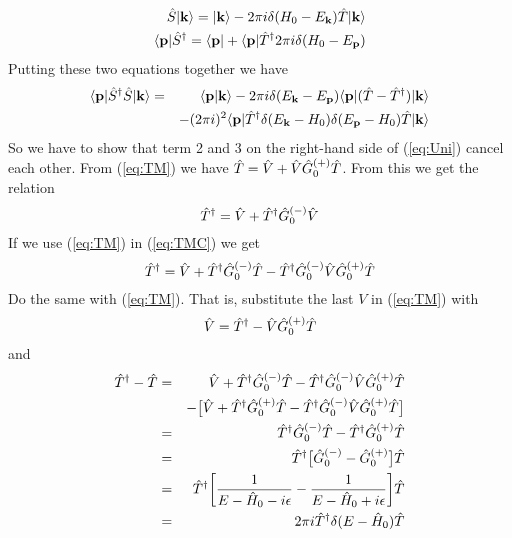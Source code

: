 \begin{eqnarray}
\hat{S}|{\bf k}\rangle=|{\bf k}\rangle-2\pi i \delta (H_0-E_{\bf k}){\hat{T}}|{\bf k}\rangle\\
\langle{\bf p}|\hat{S}^{\dagger}=\langle{\bf p}|
+\langle{\bf p}|{\hat{T}}^{\dagger}  2\pi i \delta (H_0-E_{\bf p}) 
\end{eqnarray}
%                                                 
Putting these two equations together we have
%                                                 
\begin{eqnarray}\label{eq:Uni} 
\braketm{{\bf p}}{\op{S}^{\dagger}\op{S}}{{\bf k}} &=&
\braket{{\bf p}}{{\bf k}}-2\pi i \delta (E_{\bf k}-E_{\bf p})\braketm{{\bf p}}
{(\op{T}-\op{T}^{\dagger})}{{\bf k}}\nonumber\\
& &
-(2\pi i)^2 
\braketm{{\bf p}}{\op{T}^{\dagger}\delta (E_{\bf k}-H_0 ) \delta (E_{\bf p}-H_0 )
\op{T}}{{\bf k}}
\end{eqnarray}
%                                                 
So we have to show that term 2 and 3 on the right-hand side of (\ref{eq:Uni}) cancel 
each other. From (\ref{eq:TM}) we have $\hat{T}=\hat{V}+\hat{V}\hat{G}^{(+)}_0\hat{T}$. 
From this we get the relation
%                                                 
\begin{equation}\label{eq:TMC} 
\op{T}^{\dagger}=\op{V}+\op{T}^{\dagger}\op{G}^{(-)}_0\op{V}
\end{equation}
%                                                 
If we use (\ref{eq:TM}) in (\ref{eq:TMC})  we get
%                                                 
\begin{equation}\label{eq:TMCT}
\op{T}^{\dagger}=\op{V}+\op{T}^{\dagger}\op{G}^{(-)}_0\op{T}-\op{T}^{\dagger}
\op{G}^{(-)}_0\op{V}\op{G}^{(+)}_0\op{T}
\end{equation}
%
Do the same with (\ref{eq:TM}). That is, substitute the last $V$ in (\ref{eq:TM}) with
%
\begin{equation}
\hat{V}=\hat{T}^{\dagger}-\hat{V}\hat{G}^{(+)}_0\hat{T}
\end{equation}
%
and
%
\begin{eqnarray}\label{eq:bevisT}
\op{T}^{\dagger}-\op{T} &=& \op{V}+\op{T}^{\dagger}\op{G}^{(-)}_0\op{T}-\op{T}^{\dagger}
\op{G}^{(-)}_0\op{V}\op{G}^{(+)}_0\op{T}\nonumber\\
& &
-\big[\op{V}+\op{T}^{\dagger}\op{G}^{(+)}_0\op{T}-\op{T}^{\dagger}
\op{G}^{(-)}_0\op{V}\op{G}^{(+)}_0\op{T}\big]\nonumber\\
&=&
\op{T}^{\dagger}\op{G}^{(-)}_0\op{T}-\op{T}^{\dagger}\op{G}^{(+)}_0\op{T}\nonumber\\ 
&=&
\op{T}^{\dagger}\big[\op{G}^{(-)}_0-\op{G}^{(+)}_0\big]\op{T}\nonumber\\
&=&
\op{T}^{\dagger}\bigg[\inv{E-\op{H}_0-i\epsilon}-
\inv{E-\op{H}_0+i\epsilon}\bigg]\op{T}\nonumber\\ 
&=& 
2\pi i \op{T}^{\dagger} \delta (E-\op{H}_0 )\op{T}
\end{eqnarray}
